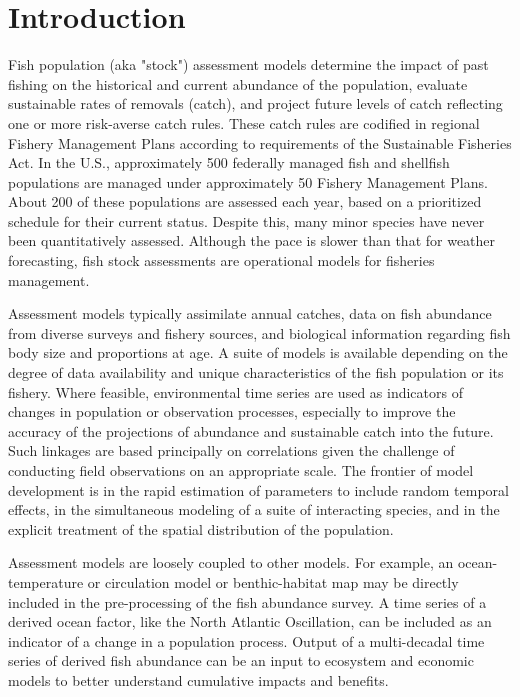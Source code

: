 
\section{Introduction}\label{sec:intro}

Fish population (aka "stock")  assessment models determine the impact of past fishing on the historical and current abundance of the population, evaluate sustainable rates of removals (catch), and project future levels of catch reflecting one or more risk-averse catch rules.  These catch rules are codified in regional Fishery Management Plans according to requirements of the Sustainable Fisheries Act.  In the U.S., approximately 500 federally managed fish and shellfish populations are managed under approximately 50 Fishery Management Plans.  About 200 of these populations are assessed each year, based on a prioritized schedule for their current status. Despite this, many minor species have never been quantitatively assessed.  Although the pace is slower than that for weather forecasting, fish stock assessments are operational models for fisheries management.

Assessment models typically assimilate annual catches, data on fish abundance from diverse surveys and fishery sources, and biological information regarding fish body size and proportions at age.  A suite of models is available depending on the degree of data availability and unique characteristics of the fish population or its fishery.  Where feasible, environmental time series are used as indicators of changes in population or observation processes, especially to improve the accuracy of the projections of abundance and sustainable catch into the future.  Such linkages are based principally on correlations given the challenge of conducting field observations on an appropriate scale.  The frontier of model development is in the rapid estimation of parameters to include random temporal effects, in the simultaneous modeling of a suite of interacting species, and in the explicit treatment of the spatial distribution of the population.

Assessment models are loosely coupled to other models. For example, an ocean-temperature or circulation model or benthic-habitat map may be directly included in the pre-processing of the fish abundance survey.  A time series of a derived ocean factor, like the North Atlantic Oscillation, can be included as an indicator of a change in a population process.  Output of a multi-decadal time series of derived fish abundance can be an input to ecosystem and economic models to better understand cumulative impacts and benefits. 

